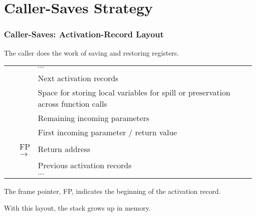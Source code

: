 \documentclass{beamer}
\renewcommand{\emph}[1]{\textcolor{structure}{#1}}
\newcommand{\emp}[1]{\textcolor{DikuRed}{ #1}}
\begin{document}
\section{Caller-Saves Strategy}

\begin{frame}[fragile]
	\tableofcontents[currentsection]
\end{frame}


\begin{frame}
\frametitle{Caller-Saves: Activation-Record Layout}

\emp{The caller does the work of saving and restoring registers.}

\renewcommand{\arraystretch}{0.9}
\begin{center}
\begin{tabular}{r|p{17em}|}

& $\cdots$ \\

& Next activation records \\\hline

 & Space for storing local variables for spill or preservation across
function calls \\\cline{2-2}

 & Remaining incoming parameters  \\\cline{2-2}

 & First incoming parameter / return value  \\\cline{2-2}

FP $\longrightarrow$ & Return address \\\hline
& Previous activation records \\
& $\cdots$
\end{tabular}
\end{center}


\emp{The frame pointer, FP,} indicates the beginning of the activation
record.\smallskip

With this layout, \emph{the stack grows up in memory}.

\end{frame}
\end{document}
